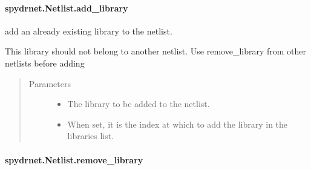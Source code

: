 \documentclass[letterpaper,10pt,english,openany,oneside]{sphinxmanual}
\begin{document}
\paragraph{spydrnet.Netlist.add\_library}
\label{\detokenize{reference/classes/generated/spydrnet.Netlist.add_library:spydrnet-netlist-add-library}}\label{\detokenize{reference/classes/generated/spydrnet.Netlist.add_library::doc}}

\begin{fulllineitems}
\label{\detokenize{reference/classes/generated/spydrnet.Netlist.add_library:spydrnet.Netlist.add_library}}
add an already existing library to the netlist.

This library should not belong to another netlist. Use
remove\_library from other netlists before adding
\begin{quote}\begin{description}
\item[{Parameters}] \leavevmode\begin{itemize}
\item {} 
 \textendash{} The library to be added to the netlist.

\item {} 
 \textendash{} When set, it is the index at which to add the library in the libraries list.

\end{itemize}

\end{description}\end{quote}

\end{fulllineitems}



\paragraph{spydrnet.Netlist.remove\_library}
\label{\detokenize{reference/classes/generated/spydrnet.Netlist.remove_library:spydrnet-netlist-remove-library}}\label{\detokenize{reference/classes/generated/spydrnet.Netlist.remove_library::doc}}
\end{document}
